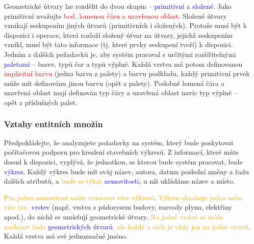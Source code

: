\documentclass{beamer}
\begin{document}
{\begin{frame}
{    \hspace{0.5cm}Geometrické útvary lze rozdělit do dvou skupin -- \textcolor{blue}{primitivní} a \textcolor{blue}{složené}. Jako primitivní
    uvažujte \textcolor{red}{bod, lomenou čáru a uzavřenou oblast}. Složené útvary vznikají seskupením jiných
    útvarů (primitivních i složených). Protože musí být k dispozici i operace, která rozloží
    složený útvar na útvary, jejichž seskupením vznikl, musí být tato informace (tj. které
    prvky seskupení tvoří) k dispozici. Jedním z dalších požadavků je, aby systém pracoval
    s určitými rozšířitelnými \textcolor{blue}{paletami} -- barev, typů čar a typů výplně. Každá vrstva má
    potom definovanou \textcolor{red}{implicitní barvu} (jedna barva  z  palety) a barvu podkladu, každý
    primitivní prvek může mít definovánu jinou barvu (opět z palety). Podobně lomená čára
    a uzavřená oblast mají definován typ čáry a uzavřená oblast navíc typ výplně – opět
    z příslušných palet.\par}
  \end{frame}
{
{
\begin{frame}[plain]
\end{frame}
}
  \begin{frame}
      \frametitle{Vztahy entitních množin}
      \scriptsize{
      \hspace{0.5cm}Předpokládejte, že analyzujete požadavky na systém, který bude poskytovat počítačovou
      podporu pro kreslení stavebních výkresů. Z informací, které máte dosud k dispozici,
      vyplývá, že jednotkou, se kterou bude systém pracovat, bude \textcolor{blue}{výkres}. Každý výkres bude
      mít svůj název, autora, datum poslední změny a řadu dalších atributů, a \textcolor{orange}{bude se týkat}
      \textcolor{blue}{nemovitosti}, u níž ukládáme název a místo.\par


      \hspace{0.5cm}\textcolor{orange}{Pro jednu nemovitost může existovat více výkresů}. \textcolor{orange}{Výkres obsahuje jednu nebo více tzv.}
      \textcolor{blue}{vrstev} (např. vrstva s půdorysem budovy, rozvody plynu, elektřiny apod.), do nichž se
      umísťují geometrické útvary. \textcolor{orange}{Na jedné vrstvě se může nacházet řada \textcolor{blue}{geometrických útvarů},
      ale každý z nich je vždy jen na jedné vrstvě}. Každá vrstva má své jednoznačné jméno.\par


}
\end{frame}}}
\end{document}

